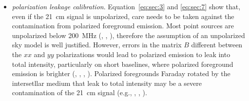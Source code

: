\begin{itemize}
\item {\it polarization leakage calibration}. Equation~\ref{eq:sec:3} and \ref{eq:sec:7} show that, even if the 21~cm signal is unpolarized, care needs to be taken against the contamination from polarized foreground emission. Most point sources are unpolarized below 200~MHz (\cite{bernardi13}, \cite{lenc16}, \cite{lofar}), therefore the assumption of an unpolarized sky model is well justified. However, errors in the matrix $B$ different between the $xx$ and $yy$ polarizations would lead to polarized emission to leak into total intensity, particularly on short baselines, where polarized foreground emission is brighter (\cite{bernardi09}, \cite{iacobelli13}, \cite{jelic15}, \cite{lenc16}). Polarized foregrounds Faraday rotated by the intersetllar medium that leak to total intensity may be a severe contamination of the 21~cm signal (e.g., \cite{jelic10}, \cite{moore13}, \cite{nunhokee17}).


\end{itemize}
